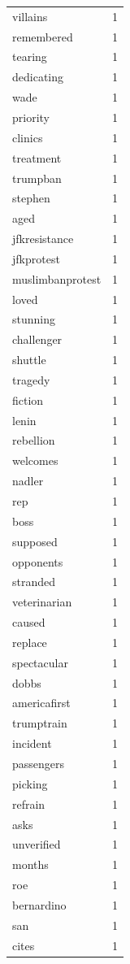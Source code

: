 \begin{tabular}{lr}
villains & 1 \\
remembered & 1 \\
tearing & 1 \\
dedicating & 1 \\
wade & 1 \\
priority & 1 \\
clinics & 1 \\
treatment & 1 \\
trumpban & 1 \\
stephen & 1 \\
aged & 1 \\
jfkresistance & 1 \\
jfkprotest & 1 \\
muslimbanprotest & 1 \\
loved & 1 \\
stunning & 1 \\
challenger & 1 \\
shuttle & 1 \\
tragedy & 1 \\
fiction & 1 \\
lenin & 1 \\
rebellion & 1 \\
welcomes & 1 \\
nadler & 1 \\
rep & 1 \\
boss & 1 \\
supposed & 1 \\
opponents & 1 \\
stranded & 1 \\
veterinarian & 1 \\
caused & 1 \\
replace & 1 \\
spectacular & 1 \\
dobbs & 1 \\
americafirst & 1 \\
trumptrain & 1 \\
incident & 1 \\
passengers & 1 \\
picking & 1 \\
refrain & 1 \\
asks & 1 \\
unverified & 1 \\
months & 1 \\
roe & 1 \\
bernardino & 1 \\
san & 1 \\
cites & 1 \\

\end{tabular}
